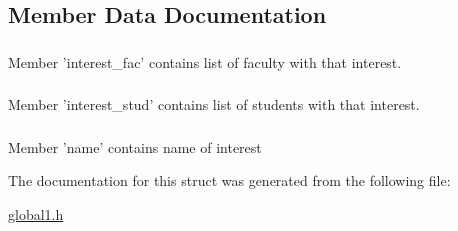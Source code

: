 \subsection{\-Member \-Data \-Documentation}
\hypertarget{structinterest_a19e8aa2cc4abff18e329f6a2fbcaa07c}{
\subsubsection[{interest\-\_\-fac}]{}}\label{structinterest_a19e8aa2cc4abff18e329f6a2fbcaa07c}
\-Member 'interest\-\_\-fac' contains list of faculty with that interest. \hypertarget{structinterest_a8e0fd6edf9d01b082b324c51e6856b79}{
\subsubsection[{interest\-\_\-stud}]{}}\label{structinterest_a8e0fd6edf9d01b082b324c51e6856b79}
\-Member 'interest\-\_\-stud' contains list of students with that interest. \hypertarget{structinterest_a92ad14a1e0add2231b55593c5939383f}{
\subsubsection[{name}]{}}\label{structinterest_a92ad14a1e0add2231b55593c5939383f}
\-Member 'name' contains name of interest 

\-The documentation for this struct was generated from the following file\-:\begin{DoxyCompactItemize}
\item 
\hyperlink{global1_8h}{global1.\-h}\end{DoxyCompactItemize}
